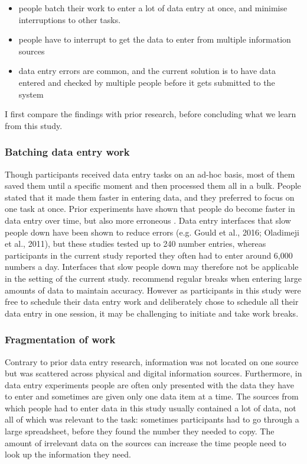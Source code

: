 \begin{itemize}

\item 
people batch their work to enter a lot of data entry at once, and minimise interruptions to other tasks. 
\item 
people have to interrupt to get the data to enter from multiple information sources
\item 
data entry errors are common, and the current solution is to have data entered and checked by multiple people before it gets submitted to the system
\end{itemize}

I first compare the findings with prior research, before concluding what we learn from this study. 

\subsubsection{Batching data entry work}
Though participants received data entry tasks on an ad-hoc basis, most of them saved them until a specific moment and then processed them all in a bulk. People stated that it made them faster in entering data, and they preferred to focus on one task at once. Prior experiments have shown that people do become faster in data entry over time, but also more erroneous \citep{Healy2004}. Data entry interfaces that slow people down have been shown to reduce errors (e.g. Gould et al., 2016; Oladimeji et al., 2011), but these studies tested up to 240 number entries, whereas participants in the current study reported they often had to enter around 6,000 numbers a day. Interfaces that slow people down may therefore not be applicable in the setting of the current study. \citet{Healy2004} recommend regular breaks when entering large amounts of data to maintain accuracy. However as participants in this study were free to schedule their data entry work and deliberately chose to schedule all their data entry in one session, it may be challenging to initiate and take work breaks. 

\subsubsection{Fragmentation of work}
Contrary to prior data entry research, information was not located on one source but was scattered across physical and digital information sources. Furthermore, in data entry experiments people are often only presented with the data they have to enter and sometimes are given only one data item at a time. The sources from which people had to enter data in this study usually contained a lot of data, not all of which was relevant to the task: sometimes participants had to go through a large spreadsheet, before they found the number they needed to copy. The amount of irrelevant data on the sources can increase the time people need to look up the information they need. 

